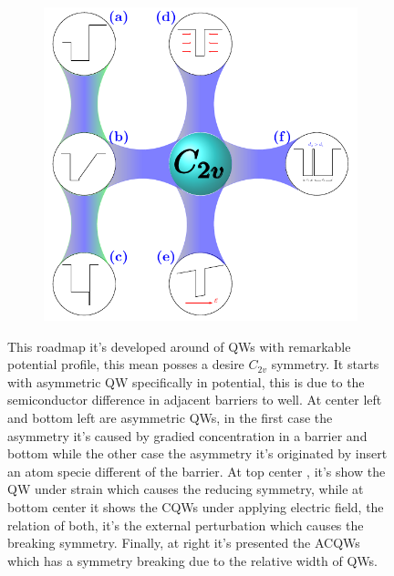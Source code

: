 \begin{figure}
	\centering
	\begin{subfigure}{\textwidth}
		\includegraphics[width=\textwidth]{../figures/chapter-2/symmetry/out/roadmap}
		\label{subfig:subsubsec:chapter-2-roadmap-a}
		\label{subfig:subsubsec:chapter-2-roadmap-b}
		\label{subfig:subsubsec:chapter-2-roadmap-c}
		\label{subfig:subsubsec:chapter-2-roadmap-d}
		\label{subfig:subsubsec:chapter-2-roadmap-e}
		\label{subfig:subsubsec:chapter-2-roadmap-f}
	\end{subfigure}
	\caption
	{
		This roadmap it's developed around of QWs with remarkable potential profile, this mean posses a desire $C_{2v}$ symmetry. It starts with asymmetric QW \cite{koopmans1998microscopic,andrada1997spin} specifically in potential, this is  due to the semiconductor difference in adjacent barriers to well. At center left  and bottom left are asymmetric QWs, in the first case the asymmetry\cite{english2013effect,eldridge2011spinorbit} it's caused by gradied concentration in a barrier and bottom while the other case the asymmetry it's originated by insert an atom specie different of the barrier\cite{yu2015tuning}. At top center , it's show the QW under strain\cite{english2011strain,tang2009well-width,li2019quantitative} which causes the reducing symmetry, while at bottom center it shows the CQWs under applying electric field\cite{kwok1992giant}, the relation of both, it's the external perturbation which causes the breaking symmetry.  Finally, at right  it's presented the ACQWs which has a symmetry breaking due to the relative width of QWs\cite{ruiz2021optical}.  
	}
	\label{fig:subsubsec:chapter-2-special-symmetry--roadmap}
\end{figure}


